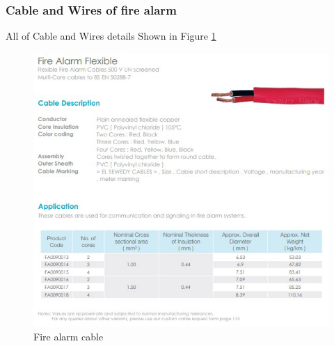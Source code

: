 \documentclass[12pt,fleqn]{book} %
\begin{document}
\subsubsection{Cable and Wires of fire alarm}
All of Cable and Wires details Shown in Figure \ref{fig:hamdy 47}
 \begin{figure}[!h]
    \centering
    \includegraphics[width=1\linewidth]{hamdy 47.png}
    \caption{Fire alarm cable}
    \label{fig:hamdy 47}
    \end{figure}
\end{document}

